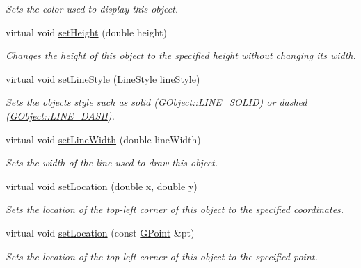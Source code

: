 \begin{DoxyCompactItemize}
\begin{DoxyCompactList}\small\item\em Sets the color used to display this object. \end{DoxyCompactList}\item 
virtual void \mbox{\hyperlink{classGObject_a9e280bfc4544dfaf8e4376c4e1a74357}{set\+Height}} (double height)
\begin{DoxyCompactList}\small\item\em Changes the height of this object to the specified height without changing its width. \end{DoxyCompactList}\item 
virtual void \mbox{\hyperlink{classGObject_add11575087eb94f1a71faa3f826c6341}{set\+Line\+Style}} (\mbox{\hyperlink{classGObject_a86e0f5648542856159bb40775c854aa7}{Line\+Style}} line\+Style)
\begin{DoxyCompactList}\small\item\em Sets the object\textquotesingle{}s style such as solid (\mbox{\hyperlink{classGObject_a86e0f5648542856159bb40775c854aa7a700c78bc2cd76acaab26651bf7b4941f}{G\+Object\+::\+L\+I\+N\+E\+\_\+\+S\+O\+L\+ID}}) or dashed (\mbox{\hyperlink{classGObject_a86e0f5648542856159bb40775c854aa7a9ccba0845f785d81d07b333ae1aad84e}{G\+Object\+::\+L\+I\+N\+E\+\_\+\+D\+A\+SH}}). \end{DoxyCompactList}\item 
virtual void \mbox{\hyperlink{classGObject_afd6a47c6ea6a1f85ca05a65ba3ff3477}{set\+Line\+Width}} (double line\+Width)
\begin{DoxyCompactList}\small\item\em Sets the width of the line used to draw this object. \end{DoxyCompactList}\item 
virtual void \mbox{\hyperlink{classGObject_a04594e8ba9b98513a64f1da00dcae18c}{set\+Location}} (double x, double y)
\begin{DoxyCompactList}\small\item\em Sets the location of the top-\/left corner of this object to the specified coordinates. \end{DoxyCompactList}\item 
virtual void \mbox{\hyperlink{classGObject_aa8480c0b7166cdf8f784cece06ab353f}{set\+Location}} (const \mbox{\hyperlink{classGPoint}{G\+Point}} \&pt)
\begin{DoxyCompactList}\small\item\em Sets the location of the top-\/left corner of this object to the specified point. \end{DoxyCompactList}\item 

\end{DoxyCompactItemize}
